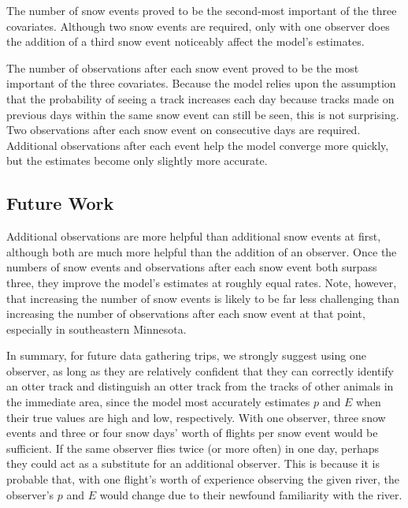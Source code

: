 \documentclass[12pt]{article}
\begin{document}
    The number of snow events proved to be the second-most important of the
    three covariates. Although two snow events are required, only with one
    observer does the addition of a third snow event noticeably affect the
    model's estimates.

    The number of observations after each snow event proved to be the most
    important of the three covariates. Because the model relies upon the
    assumption that the probability of seeing a track increases each day because
    tracks made on previous days within the same snow event can still be seen,
    this is not surprising. Two observations after each snow event on
    consecutive days are required. Additional observations after each event help
    the model converge more quickly, but the estimates become only slightly more
    accurate.

    \subsection{Future Work}
    Additional observations are more helpful than additional snow events at
    first, although both are much more helpful than the addition of an observer.
    Once the numbers of snow events and observations after each snow event both
    surpass three, they improve the model's estimates at roughly equal rates.
    Note, however, that increasing the number of snow events is likely to be far
    less challenging than increasing the number of observations after each snow
    event at that point, especially in southeastern Minnesota.

    In summary, for future data gathering trips, we strongly suggest using one
    observer, as long as they are relatively confident that they can correctly
    identify an otter track and distinguish an otter track from the tracks of
    other animals in the immediate area, since the model most accurately
    estimates \(p\) and \(E\) when their true values are high and low,
    respectively. With one observer, three snow events and three or four snow
    days' worth of flights per snow event would be sufficient. If the same
    observer flies twice (or more often) in one day, perhaps they could act as a
    substitute for an additional observer. This is because it is probable that,
    with one flight's worth of experience observing the given river, the
    observer's \(p\) and \(E\) would change due to their newfound familiarity
    with the river.



\end{document}
